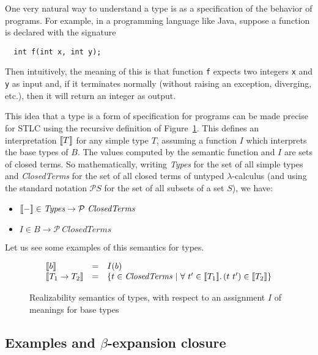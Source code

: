 One very natural way to understand a type is as a specification
of the behavior of programs.  For example, in a programming
language like Java, suppose a function is declared with the signature

\begin{verbatim}
  int f(int x, int y);
\end{verbatim}

\noindent Then intuitively, the meaning of this is that function
\verb|f| expects two integers \verb|x| and \verb|y| as input and, if
it terminates normally (without raising an exception, diverging,
etc.), then it will return an integer as output.

This idea that a type is a form of specification for programs can be
made precise for STLC using the recursive definition of
Figure~\ref{fig:stlcrealize}.  This defines an interpretation $\llbracket T \rrbracket$ for
any simple type $T$, assuming a function $I$ which interprets the base types of $B$.
The values computed by the semantic function and $I$ are sets of closed terms.  So mathematically,
writing \textit{Types} for the set of all simple types and \textit{ClosedTerms} for the set
of all closed terms of untyped $\lambda$-calculus (and using the standard notation $\mathcal{P} S$ for
the set of all subsets of a set $S$), we have:
\begin{itemize}
\item $\llbracket - \rrbracket \in \textit{Types} \to \mathcal{P}\ \textit{ClosedTerms}$
\item $I \in B \to \mathcal{P}\ \textit{ClosedTerms}$
\end{itemize}

Let us see some examples of this semantics for types.

\begin{figure}
\[
\begin{array}{lll}
\interp{b} & = & I(b) \\
\interp{T_1\to T_2} & = & \{ t\in\textit{ClosedTerms}\ |\ \all{t' \in \interp{T_1}}{(t\ t') \in\interp{T_2}} \}
\end{array}
\]
\caption{Realizability semantics of types, with respect to an assignment $I$ of meanings for base types}
\label{fig:stlcrealize}
\end{figure}

\subsection{Examples and $\beta$-expansion closure}

